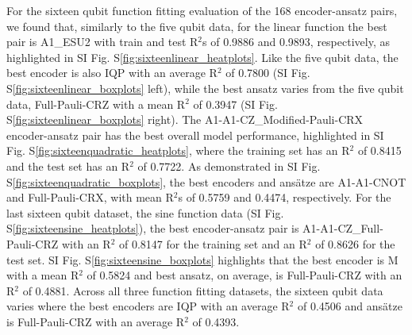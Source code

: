 \documentclass[journal=jacsat,manuscript=article]{achemso}
\newcommand{\siref}[1]{S\ref{#1}}
\begin{document}
For the sixteen qubit function fitting evaluation of the 168 encoder-ansatz pairs, we found that, similarly to the five qubit data, for the linear function the best pair is A1\_ESU2 with train and test R$^{2}$s of 0.9886 and 0.9893, respectively, as highlighted in SI Fig. \siref{fig:sixteenlinear_heatplots}.
Like the five qubit data, the best encoder is also IQP with an average R$^{2}$ of 0.7800 (SI Fig. \siref{fig:sixteenlinear_boxplots} left), while the best ansatz varies from the five qubit data, Full-Pauli-CRZ with a mean R$^{2}$ of 0.3947 (SI Fig. \siref{fig:sixteenlinear_boxplots} right).
The A1-A1-CZ\_Modified-Pauli-CRX encoder-ansatz pair has the best overall model performance, highlighted in SI Fig. \siref{fig:sixteenquadratic_heatplots}, where the training set has an R$^{2}$ of 0.8415 and the test set has an R$^{2}$ of  0.7722.
As demonstrated in SI Fig. \siref{fig:sixteenquadratic_boxplots}, the best encoders and ans\"{a}tze are A1-A1-CNOT and Full-Pauli-CRX, with mean R$^{2}$s of 0.5759 and 0.4474, respectively.
For the last sixteen qubit dataset, the sine function data (SI Fig. \siref{fig:sixteensine_heatplots}), the best encoder-ansatz pair is A1-A1-CZ\_Full-Pauli-CRZ	with an R$^{2}$ of 0.8147 for the training set and an R$^{2}$ of 0.8626	for the test set.
SI Fig. \siref{fig:sixteensine_boxplots} highlights that the best encoder is M with a mean R$^{2}$ of 0.5824 and best ansatz, on average, is Full-Pauli-CRZ with an R$^{2}$ of 0.4881.
Across all three function fitting datasets, the sixteen qubit data varies where the best encoders are IQP with an average R$^{2}$ of 0.4506 and ans\"{a}tze is Full-Pauli-CRZ with an average R$^{2}$ of 0.4393.
\end{document}

